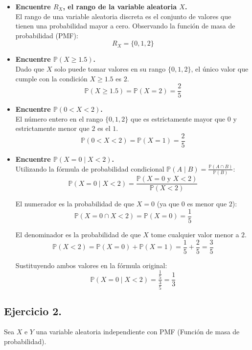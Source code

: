 \documentclass[10pt,a4paper]{book}
\begin{document}
\begin{itemize}
    \item[\textbf{a)}] \textbf{Encuentre $R_X$, el rango de la variable aleatoria $X$.} \\
    El rango de una variable aleatoria discreta es el conjunto de valores que tienen una probabilidad mayor a cero. Observando la función de masa de probabilidad (PMF):
    \[ R_X = \{0, 1, 2\} \]

    \item[\textbf{b)}] \textbf{Encuentre $\mathbb{P}(X \ge 1.5)$.} \\
    Dado que $X$ solo puede tomar valores en su rango $\{0, 1, 2\}$, el único valor que cumple con la condición $X \ge 1.5$ es $2$.
    \[ \mathbb{P}(X \ge 1.5) = \mathbb{P}(X = 2) = \frac{2}{5} \]

    \item[\textbf{c)}] \textbf{Encuentre $\mathbb{P}(0 < X < 2)$.} \\
    El número entero en el rango $\{0, 1, 2\}$ que es estrictamente mayor que $0$ y estrictamente menor que $2$ es el $1$.
    \[ \mathbb{P}(0 < X < 2) = \mathbb{P}(X = 1) = \frac{2}{5} \]

    \item[\textbf{d)}] \textbf{Encuentre $\mathbb{P}(X = 0 \mid X < 2)$.} \\
    Utilizando la fórmula de probabilidad condicional $\mathbb{P}(A \mid B) = \frac{\mathbb{P}(A \cap B)}{\mathbb{P}(B)}$:
    \[ \mathbb{P}(X = 0 \mid X < 2) = \frac{\mathbb{P}(X = 0 \text{ y } X < 2)}{\mathbb{P}(X < 2)} \]
    
    El numerador es la probabilidad de que $X = 0$ (ya que $0$ es menor que $2$):
    \[ \mathbb{P}(X = 0 \cap X < 2) = \mathbb{P}(X = 0) = \frac{1}{5} \]
    
    El denominador es la probabilidad de que $X$ tome cualquier valor menor a $2$.
    \[ \mathbb{P}(X < 2) = \mathbb{P}(X = 0) + \mathbb{P}(X = 1) = \frac{1}{5} + \frac{2}{5} = \frac{3}{5} \]
    
    Sustituyendo ambos valores en la fórmula original:
    \[ \mathbb{P}(X = 0 \mid X < 2) = \frac{\frac{1}{5}}{\frac{3}{5}} = \frac{1}{3} \]
\end{itemize}

\newpage

\subsection{Ejercicio 2.}Sea $X$ e $Y$ una variable aleatoria independiente con PMF (Función de masa de probabilidad).
\end{document}
